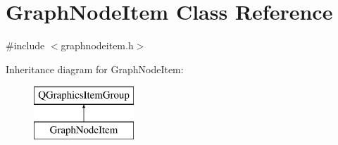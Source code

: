 \hypertarget{class_graph_node_item}{}\section{Graph\+Node\+Item Class Reference}
\label{class_graph_node_item}


{\ttfamily \#include $<$graphnodeitem.\+h$>$}

Inheritance diagram for Graph\+Node\+Item\+:\begin{figure}[H]
\begin{center}
\leavevmode
\includegraphics[height=2.000000cm]{da/df3/class_graph_node_item}
\end{center}
\end{figure}
